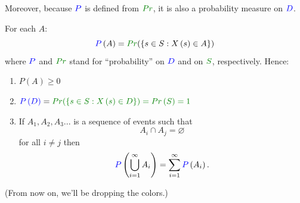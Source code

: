 \documentclass[smaller, handout]{beamer}\usepackage[]{graphicx}\usepackage[]{color}
\begin{document}
\begin{frame}{\secname}

Moreover, because $\color{blue}{P}$ is defined from $\color{Mygreen}{Pr}$, it is also {a probability measure} on $\color{blue}{D}$.

For each $A$:
  \begin{equation*}
  \color{blue}P\color{black}\left( A\right) = \color{Mygreen} {Pr} \color{black}( \left\{ s\in S :X\left(  s  \right) \in
  A\right\})
  \end{equation*}
  where $\color{blue}P \color{black}$ and $\color{Mygreen} Pr \color{black}$ stand for ``probability'' on $\color{blue} D \color{black}$
  and on $\color{Mygreen} S \color{black}$, respectively.
  Hence:
  \begin{enumerate}

  \item $P \left( A\right) \geq 0$
  \vspace{0.15cm}
  \item $\color{blue}P \left( D\right) \color{black}=\color{Mygreen}Pr (\left\{ s\in S:X\left( s\right)
  \in D\right\}) =Pr \left( S\right) =1 \color{black}$
  \vspace{0.15cm}
  \item If $A_{1},A_{2},A_{3}...$ is a sequence of events
  such that $$A_{i}\cap A_{j}=\varnothing $$ for all $i\neq j$ then
  $$\color{blue}P \color{black} \left(
  \bigcup _{i=1}^{\infty }A_{i}\right) =\sum_{i=1}^{\infty } \color{blue} P  \color{black} \left(
  A_{i}\right) . $$
  \end{enumerate}
  (From now on, we'll be dropping the colors.)
\end{frame}%
\end{document}
